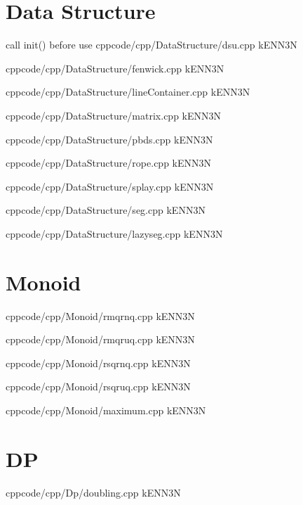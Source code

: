 \documentclass[landscape, 8pt, a4paper, twocolumn]{extarticle} %
\begin{document}
\maketitlepage


\section{Data Structure}

{call init() before use}{}
{cpp}{code/cpp/DataStructure/dsu.cpp}
{kENN3N}

{}{}
{cpp}{code/cpp/DataStructure/fenwick.cpp}
{kENN3N}

{}{}
{cpp}{code/cpp/DataStructure/lineContainer.cpp}
{kENN3N}

{}{}
{cpp}{code/cpp/DataStructure/matrix.cpp}
{kENN3N}

{}{}
{cpp}{code/cpp/DataStructure/pbds.cpp}
{kENN3N}

{}{}
{cpp}{code/cpp/DataStructure/rope.cpp}
{kENN3N}

{}{}
{cpp}{code/cpp/DataStructure/splay.cpp}
{kENN3N}

{}{}
{cpp}{code/cpp/DataStructure/seg.cpp}
{kENN3N}

{}{}
{cpp}{code/cpp/DataStructure/lazyseg.cpp}
{kENN3N}

\pagebreak 
\section{Monoid}

{}{}
{cpp}{code/cpp/Monoid/rmqrnq.cpp}
{kENN3N}

{}{}
{cpp}{code/cpp/Monoid/rmqruq.cpp}
{kENN3N}

{}{}
{cpp}{code/cpp/Monoid/rsqrnq.cpp}
{kENN3N}

{}{}
{cpp}{code/cpp/Monoid/rsqruq.cpp}
{kENN3N}

{}{}
{cpp}{code/cpp/Monoid/maximum.cpp}
{kENN3N}

\pagebreak 
\section{DP}

{}{}
{cpp}{code/cpp/Dp/doubling.cpp}
{kENN3N}
\end{document}
